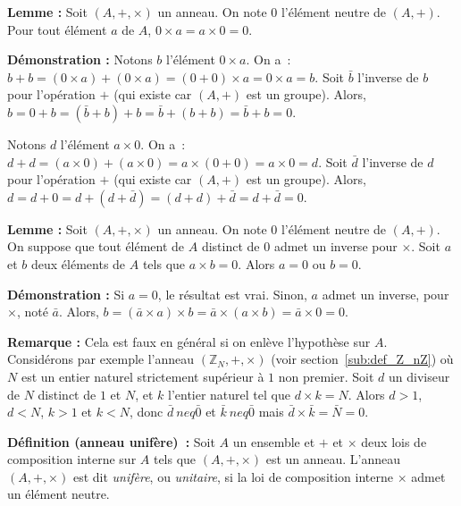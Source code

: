 \medskip

\noindent\textbf{Lemme :} Soit $(A, +, \times)$ un anneau. 
On note $0$ l'élément neutre de $(A, +)$.
Pour tout élément $a$ de $A$, $0 \times a = a \times 0 = 0$.

\medskip

\noindent\textbf{Démonstration :} 
    Notons $b$ l'élément $0 \times a$. 
    On a : $b + b = (0 \times a) + (0 \times a) = (0 + 0) \times a = 0 \times a = b$.
    Soit $\bar{b}$ l'inverse de $b$ pour l'opération $+$ (qui existe car $(A, +)$ est un groupe).
    Alors, $b = 0 + b = (\bar{b} + b) + b = \bar{b} + (b + b) = \bar{b} + b = 0$. 

    Notons $d$ l'élément $a \times 0$. 
    On a : $d + d = (a \times 0) + (a \times 0) = a \times (0 + 0) = a \times 0 = d$.
    Soit $\bar{d}$ l'inverse de $d$ pour l'opération $+$ (qui existe car $(A, +)$ est un groupe).
    Alors, $d = d + 0 = d + (d + \bar{d}) = (d + d) + \bar{d} = d + \bar{d} = 0$. 

    \done

\medskip

\noindent\textbf{Lemme :} Soit $(A, +, \times)$ un anneau. 
On note $0$ l'élément neutre de $(A, +)$.
On suppose que tout élément de $A$ distinct de $0$ admet un inverse pour $\times$.
Soit $a$ et $b$ deux éléments de $A$ tels que $a \times b = 0$.
Alors $a = 0$ ou $b = 0$.

\medskip

\noindent\textbf{Démonstration :} Si $a = 0$, le résultat est vrai.
Sinon, $a$ admet un inverse, pour $\times$, noté $\bar{a}$.
Alors, $b = (\bar{a} \times a) \times b = \bar{a} \times (a \times b) = \bar{a} \times 0 = 0$.

\done

\medskip

\noindent\textbf{Remarque :} Cela est faux en général si on enlève l'hypothèse sur $A$. 
Considérons par exemple l'anneau $(\mathbb{Z}_N, +, \times)$ (voir section~\ref{sub:def_Z_nZ}) où $N$ est un entier naturel strictement supérieur à $1$ non premier. 
Soit $d$ un diviseur de $N$ distinct de $1$ et $N$, et $k$ l'entier naturel tel que $d \times k = N$. 
Alors $d > 1$, $d < N$, $k > 1$ et $k < N$, donc $\bar{d} \ neq \bar{0}$ et $\bar{k} \ neq \bar{0}$ mais $\bar{d} \times \bar{k} = \bar{N} = 0$.

\medskip

\noindent\textbf{Définition (anneau unifère) :} Soit $A$ un ensemble et $+$ et $\times$ deux lois de composition interne sur $A$ tels que $(A, +, \times)$ est un anneau. 
    L'anneau $(A, +, \times)$ est dit \textit{unifère}, ou \textit{unitaire}, si la loi de composition interne $\times$ admet un élément neutre.

